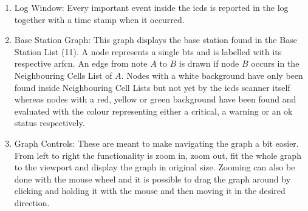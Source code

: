 \begin{enumerate}
\item Log Window: Every important event inside the \gls{icds} is reported in the log together with a time stamp when it occurred.

\item Base Station Graph: This graph displays the base station found in the Base Station List (11).
A node represents a single \gls{bts} and is labelled with its respective \gls{arfcn}.
An edge from note $A$ to $B$ is drawn if node $B$ occurs in the Neighbouring Cells List of $A$.
Nodes with a white background have only been found inside Neighbouring Cell Lists but not yet by the \gls{icds} scanner itself whereas nodes with a red, yellow or green background have been found and evaluated with the colour representing either a critical, a warning or an ok status respectively.

\item Graph Controls: These are meant to make navigating the graph a bit easier.
From left to right the functionality is zoom in, zoom out, fit the whole graph to the viewport and display the graph in original size.
Zooming can also be done with the mouse wheel and it is possible to drag the graph around by clicking and holding it with the mouse and then moving it in the desired direction.
\end{enumerate}
